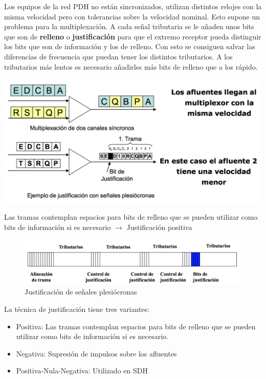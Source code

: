 \documentclass[10pt,portrait, twocolumn]{article}
\begin{document}
Los equipos de la red PDH no están sincronizados, utilizan distintos relojes con la misma velocidad pero con tolerancias sobre la velocidad nominal. Esto supone un problema para la multiplexación. A cada señal tributaria se le añaden unos bits que son de \textbf{relleno} o \textbf{justificación} para que el extremo receptor pueda distinguir los bits que son de información y los de relleno. Con esto se consiguen salvar las diferencias de frecuencia que puedan tener los distintos tributarios. A los tributarios más lentos es necesario añadirles más bits de relleno que a los rápido.

	\begin{center}
		\includegraphics[scale=0.2]{images/JustificacionPDH}
	\end{center}	

Las tramas contemplan espacios para bits de relleno que se pueden utilizar como bits de información si es necesario $\rightarrow$ Justificación positiva
	
	
	\begin{figure}[!ht]
 		\centering
  		 \includegraphics[scale = 0.35]{images/Relleno}
		\caption{Justificación de señales plesiócronas}
	\end{figure}
	

La técnica de justificación tiene tres variantes: 

	\begin{itemize}
		\item Positiva: Las tramas contemplan espacios para bits de relleno que se pueden utilizar como bits de información si es necesario.
		\item Negativa: Supresión de impulsos sobre los afluentes
		\item Positiva-Nula-Negativa: Utilizado en SDH
	\end{itemize}
	
\end{document}
